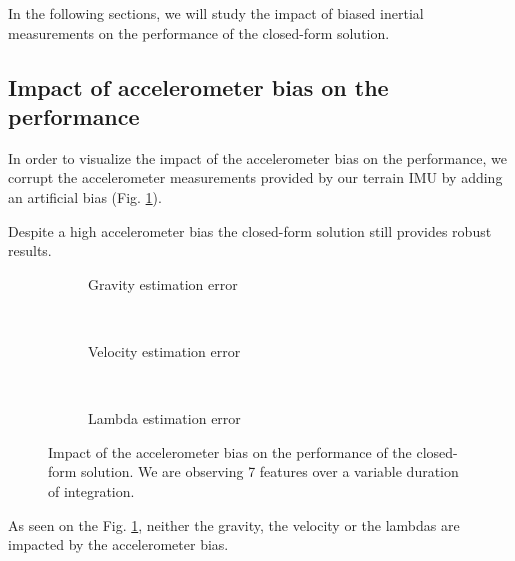 \documentclass[letterpaper, 10 pt, conference]{ieeeconf}  %
\begin{document}
In the following sections, we will study the impact of biased inertial measurements on the performance of the closed-form solution.

\subsection{Impact of accelerometer bias on the performance}
In order to visualize the impact of the accelerometer bias on the performance,
we corrupt the accelerometer measurements provided by our terrain IMU by adding an artificial bias (Fig. \ref{fig:biasAccCF}).

Despite a high accelerometer bias the closed-form solution still provides robust results.

\begin{figure}[h!]
        \centering

        \begin{subfigure}[b]{0.5\columnwidth}
                \resizebox{\columnwidth}{!}{}
                \caption{Gravity estimation error}

        \end{subfigure}%
        ~ %
        \begin{subfigure}[b]{0.5\columnwidth}
                \resizebox{\columnwidth}{!}{}
                \caption{Velocity estimation error}

        \end{subfigure}
        ~ %
        \begin{subfigure}[b]{0.5\columnwidth}
                \resizebox{\columnwidth}{!}{}
                \caption{Lambda estimation error}

        \end{subfigure}
        \caption{Impact of the accelerometer bias on the performance of the closed-form solution. We are observing 7 features  over a variable duration of integration.\label{fig:biasAccCF}}
\end{figure}

As seen on the Fig. \ref{fig:biasAccCF}, neither the gravity, the velocity or the lambdas are impacted by the accelerometer bias.
\end{document}
